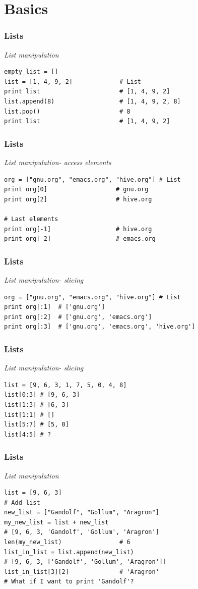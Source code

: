 \documentclass[bigger, presentation]{beamer}
\begin{document}
\section{Basics}
\label{sec-2}
\begin{frame}[fragile]
\frametitle{Lists}
\label{sec-2-1}

   \emph{List manipulation}


\begin{verbatim}
empty_list = []
list = [1, 4, 9, 2]             # List
print list                      # [1, 4, 9, 2]
list.append(8)                  # [1, 4, 9, 2, 8]
list.pop()                      # 8
print list                      # [1, 4, 9, 2]
\end{verbatim}
\end{frame}
\begin{frame}[fragile]
\frametitle{Lists}
\label{sec-2-2}

   \emph{List manipulation- access elements}


\begin{verbatim}
org = ["gnu.org", "emacs.org", "hive.org"] # List
print org[0]                   # gnu.org
print org[2]                   # hive.org

# Last elements
print org[-1]                  # hive.org
print org[-2]                  # emacs.org
\end{verbatim}
\end{frame}
\begin{frame}[fragile]
\frametitle{Lists}
\label{sec-2-3}

   \emph{List manipulation- slicing}


\begin{verbatim}
org = ["gnu.org", "emacs.org", "hive.org"] # List
print org[:1]  # ['gnu.org']
print org[:2]  # ['gnu.org', 'emacs.org']
print org[:3]  # ['gnu.org', 'emacs.org', 'hive.org']
\end{verbatim}
\end{frame}
\begin{frame}[fragile]
\frametitle{Lists}
\label{sec-2-4}

   \emph{List manipulation- slicing}


\begin{verbatim}
list = [9, 6, 3, 1, 7, 5, 0, 4, 8]
list[0:3] # [9, 6, 3]
list[1:3] # [6, 3]
list[1:1] # []
list[5:7] # [5, 0]
list[4:5] # ?
\end{verbatim}
\end{frame}
\begin{frame}[fragile]
\frametitle{Lists}
\label{sec-2-5}

   \emph{List manipulation}


\begin{verbatim}
list = [9, 6, 3]
# Add list
new_list = ["Gandolf", "Gollum", "Aragron"]
my_new_list = list + new_list
# [9, 6, 3, 'Gandolf', 'Gollum', 'Aragron']
len(my_new_list)                # 6
list_in_list = list.append(new_list)
# [9, 6, 3, ['Gandolf', 'Gollum', 'Aragron']]
list_in_list[3][2]              # 'Aragron'
# What if I want to print 'Gandolf'?
\end{verbatim}
\end{frame}
\end{document}
